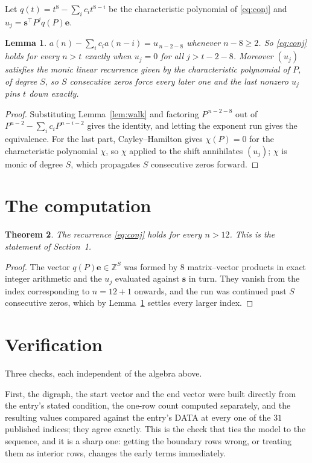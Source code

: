 \documentclass[11pt,a4paper]{article}
\theoremstyle{plain}
\newtheorem{theorem}{Theorem}
\newtheorem{lemma}[theorem]{Lemma}
\theoremstyle{definition}
\begin{document}
Let $q(t)=t^{8}-\sum_i c_i t^{8-i}$ be the characteristic polynomial of
\eqref{eq:conj} and $u_j=\mathbf{s}^{\!\top}P^{j}q(P)\mathbf{e}$.

\begin{lemma}\label{lem:crit}
$a(n)-\sum_i c_i a(n-i)=u_{\,n-2-8}$ whenever $n-8\ge2$. So \eqref{eq:conj}
holds for every $n>t$ exactly when $u_j=0$ for all $j>t-2-8$. Moreover $(u_j)$
satisfies the monic linear recurrence given by the characteristic polynomial of $P$, of
degree $S$, so $S$ consecutive zeros force every later one and the last nonzero $u_j$ pins
$t$ down exactly.
\end{lemma}

\begin{proof}
Substituting Lemma~\ref{lem:walk} and factoring $P^{\,n-2-8}$ out of
$P^{n-2}-\sum_i c_i P^{n-i-2}$ gives the identity, and letting the exponent run gives the
equivalence. For the last part, Cayley--Hamilton gives $\chi(P)=0$ for the characteristic
polynomial $\chi$, so $\chi$ applied to the shift annihilates $(u_j)$; $\chi$ is monic of
degree $S$, which propagates $S$ consecutive zeros forward.
\end{proof}

\section{The computation}

\begin{theorem}
The recurrence \eqref{eq:conj} holds for every $n>12$. This is the statement of
Section~1.
\end{theorem}

\begin{proof}
The vector $q(P)\mathbf{e}\in\mathbb{Z}^{S}$ was formed by $8$ matrix--vector
products in exact integer arithmetic and the $u_j$ evaluated against $\mathbf{s}$ in turn.
They vanish from the index corresponding to $n=12+1$ onwards, and the run was continued
past $S$ consecutive zeros, which by Lemma~\ref{lem:crit} settles every larger index.
\end{proof}

\section{Verification}

Three checks, each independent of the algebra above.

First, the digraph, the start vector and the end vector were built directly from the
entry's stated condition, the one-row count computed separately, and the resulting values
compared against the entry's DATA at every one of the $31$ published indices; they
agree exactly. This is the check that ties the model to the sequence, and it is a sharp one:
getting the boundary rows wrong, or treating them as interior rows, changes the early terms
immediately.
\end{document}
